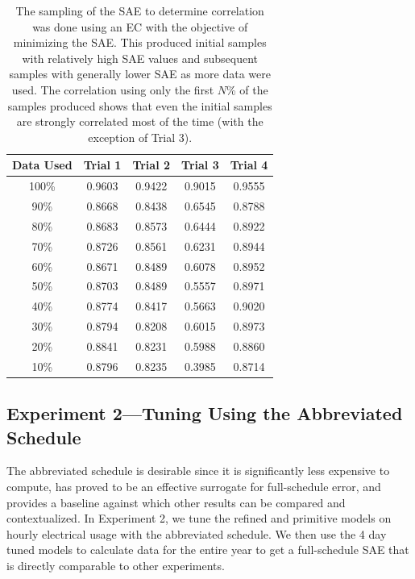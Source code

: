 \documentclass[preprint, review, 12pt]{elsarticle}
\begin{document}
\begin{table}[htbp]
\centering
\caption{The sampling of the SAE to determine correlation was done using an EC with the objective of minimizing the SAE. This produced initial samples with relatively high SAE values and subsequent samples with generally lower SAE as more data were used. The correlation using only the first $N$\% of the samples produced shows that even the initial samples are strongly correlated most of the time (with the exception of Trial 3).}
\label{tab:hour-corr}
\begin{tabular}{ccccc}
\toprule
Data Used & Trial 1 & Trial 2 & Trial 3 & Trial 4\\
\midrule
100\% & 0.9603 & 0.9422 & 0.9015 & 0.9555\\\rowcolor{DarkRow}
90\%  & 0.8668 & 0.8438 & 0.6545 & 0.8788\\
80\%  & 0.8683 & 0.8573 & 0.6444 & 0.8922\\\rowcolor{DarkRow}
70\%  & 0.8726 & 0.8561 & 0.6231 & 0.8944\\
60\%  & 0.8671 & 0.8489 & 0.6078 & 0.8952\\\rowcolor{DarkRow}
50\%  & 0.8703 & 0.8489 & 0.5557 & 0.8971\\
40\%  & 0.8774 & 0.8417 & 0.5663 & 0.9020\\\rowcolor{DarkRow}
30\%  & 0.8794 & 0.8208 & 0.6015 & 0.8973\\
20\%  & 0.8841 & 0.8231 & 0.5988 & 0.8860\\\rowcolor{DarkRow}
10\%  & 0.8796 & 0.8235 & 0.3985 & 0.8714\\
\bottomrule
\end{tabular}
\end{table}


\subsection{Experiment 2---Tuning Using the Abbreviated Schedule}
\label{sub:experiment2}
The abbreviated schedule is desirable since it is significantly less expensive to compute, has proved to be an effective surrogate for full-schedule error, and provides a baseline against which other results can be compared and contextualized. In Experiment 2, we tune the refined and primitive models on hourly electrical usage with the abbreviated schedule. We then use the 4 day tuned models to calculate data for the entire year to get a full-schedule SAE that is directly comparable to other experiments. %
\end{document}
